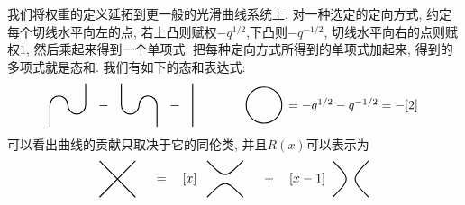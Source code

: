 \documentclass[twoside]{article}
\begin{document}
我们将权重的定义延拓到更一般的光滑曲线系统上.
对一种选定的定向方式,
约定每个切线水平向左的点, 若上凸则赋权$-q^{1/2}$,下凸则$-q^{-1/2}$,
切线水平向右的点则赋权$1$,
然后乘起来得到一个单项式.
把每种定向方式所得到的单项式加起来, 得到的多项式就是态和.
我们有如下的态和表达式:
\[
    \begin{tikzpicture}[
        scale = .5,
        thick
    ]
        \begin{scope}[shift={(0,0)}]
            \draw (-1, -1.2) -- (-1, 0) arc (180:0:.5) arc (180:360:.5) -- (1, 1.2);
        \end{scope}
        \node at (2, 0) {$=$};
        \begin{scope}[shift={(4,0)}]
            \draw (-1, 1.2) -- (-1, 0) arc (180:360:.5) arc (180:0:.5) -- (1, -1.2);
        \end{scope}
        \node at (6, 0) {$=$};
        \draw (7, 1.2) -- (7, -1.2);

        \draw (11, 0) circle (1);
        \node[inner sep = 0] at (16, 0) {$= -q^{1/2} - q^{-1/2} = -[2]$};
    \end{tikzpicture}  
\]
可以看出曲线的贡献只取决于它的同伦类, 并且$R(x)$可以表示为
\[
    \begin{tikzpicture}[
        scale = .5,
        thick
    ]
        \begin{scope}[shift={(0,0)}]
            \draw (-1, -1) -- (1, 1) (-1, 1) -- (1, -1);
        \end{scope}
        \node at (3.3, 0) {$= \quad [x]$};
        \begin{scope}[shift={(6,0)}]
            \draw (-1, 1) .. controls (0, 0) and (0, 0) .. (1, 1);
            \draw (-1, -1) .. controls (0, 0) and (0, 0) .. (1, -1);
        \end{scope}
        \node at (9.8, 0) {${} + \quad [x - 1]$};
        \begin{scope}[shift={(13,0)}]
            \draw (-1, 1) .. controls (0, 0) and (0, 0) .. (-1, -1);
            \draw (1, 1) .. controls (0, 0) and (0, 0) .. (1, -1);
        \end{scope}
    \end{tikzpicture}  
\]
\end{document}

